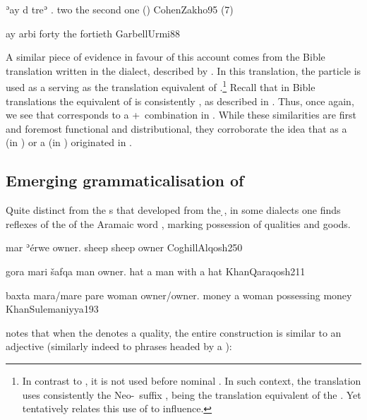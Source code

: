 {
{ʾay d\cb{} treʾ}
{.\fem{} \lnk\cb{} two}
{the second one (\fem)}
{CohenZakho}{95 (7)}
		
{ay arbi}
{\lnk{} forty}
{the fortieth}
{GarbellUrmi}{88}



A similar piece of evidence in favour of this account comes from the Bible translation written in the \Ruw dialect, described by \citet{ReesTargum}. In this translation, the particle  is used as a \rel* serving as the translation equivalent of \BHeb \rel* {} \citep[27]{ReesTargum}.\footnote{In contrast to \JUrm, it is not used before nominal \secns. In such context, the \Ruw translation uses consistently the Neo-\cst\ suffix , being the translation equivalent of the \BHeb \cst* \citep[82]{ReesTargum}. Yet  \citet[27]{ReesTargum} tentatively relates this use of  to \JUrm influence.} Recall that in \JZax Bible translations the equivalent of  is consistently , as described in . Thus, once again, we see that  corresponds to a \dem+\cst\ combination in \JZax. While these similarities are first and foremost functional and distributional, they corroborate the idea that  as a \lnk* (in \JUrm) or a \rel* (in \Ruw) originated in .

\subsection{Emerging grammaticalisation of } \label{ss:mara}

\largerpage
Quite distinct from the \lnk*s that developed from the \d \lnk*, in some dialects one finds reflexes of the \cst* of the Aramaic word , marking possession of qualities and goods. 

{mar\cb{} ʾérwe}
{owner.\cst\cb{} sheep}
{sheep owner}
{CoghillAlqosh}{250}\antipar 


{gora mari šafqa}
{man owner.\cst{} hat}
{a man with a hat}
{KhanQaraqosh}{211}\antipar 
\newpage 

{baxta mara/mare pare}
{woman owner/owner.\cst{} money}
{a woman possessing money}
{KhanSulemaniyya}{193}

\citet[225]{CohenZakho} notes that when the \secn denotes a quality, the entire construction is similar to an adjective (similarly indeed to phrases headed by a \lnk*):

}
